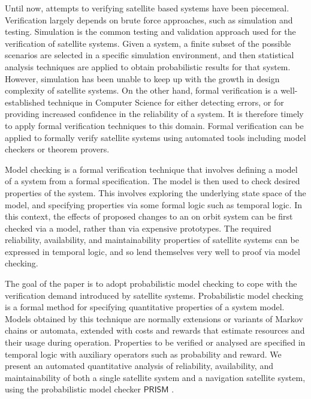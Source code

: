 \documentclass[preprint,12pt]{qrei}
\begin{document}
Until now, attempts to verifying satellite based systems have been piecemeal. Verification largely depends on brute force approaches, such as simulation and testing. Simulation is the common testing and validation approach used for the verification of satellite systems. Given a system, a finite subset of the possible scenarios are selected in a specific simulation environment, and then statistical analysis techniques are applied to obtain probabilistic results for that system. However, simulation has been unable to keep up with the growth in design complexity of satellite systems. On the other hand, formal verification is a well-established technique in Computer Science for either detecting errors, or for providing increased confidence in the reliability of a system. It is therefore timely to apply formal verification techniques to this domain. Formal verification can be applied to formally verify satellite systems using automated tools including model checkers or theorem provers.

Model checking is a formal verification technique that involves defining a model of a system from a formal specification. The model is then used to check desired properties of the system. This involves exploring the underlying state space of the model, and specifying properties via some formal logic such as temporal logic. In this context, the effects of proposed changes to an on orbit system can be first checked via a model, rather than via expensive prototypes. The required reliability, availability, and maintainability properties of satellite systems can be expressed in temporal logic, and so lend themselves very well to proof via model checking.

The goal of the paper is to adopt probabilistic model checking to cope with the verification demand introduced by satellite systems. Probabilistic model checking is a formal method for specifying quantitative properties of a system model. Models obtained by this technique are normally extensions or variants of Markov chains or automata, extended with costs and rewards that estimate resources and their usage during operation. Properties to be verified or analysed are specified in temporal logic with auxiliary operators such as probability and reward. We present an automated quantitative analysis of reliability, availability, and maintainability of both a single satellite system and a navigation satellite system, using the probabilistic model checker $\mathsf{PRISM}$ \cite{KNP09}.
\end{document}
